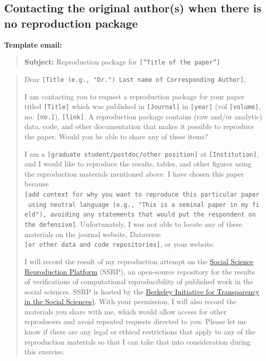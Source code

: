 \documentclass[]{book}
\begin{document}
\hypertarget{contacting-the-original-authors-when-there-is-no-reproduction-package}{%
\subsection{Contacting the original author(s) when there is no reproduction package}\label{contacting-the-original-authors-when-there-is-no-reproduction-package}}

\textbf{Template email:}

\begin{quote}
\textbf{Subject:} Reproduction package for \texttt{{[}“Title\ of\ the\ paper”{]}}
\end{quote}

\begin{quote}
Dear \texttt{{[}Title\ (e.g.,\ "Dr.")\ Last\ name\ of\ Corresponding\ Author{]}},

I am contacting you to request a reproduction package for your paper titled \texttt{{[}Title{]}} which was published in \texttt{{[}Journal{]}} in \texttt{{[}year{]}} (vol \texttt{{[}volume{]}}, no. \texttt{{[}no.{]}}), \texttt{{[}link{]}}. A reproduction package contains (raw and/or analytic) data, code, and other documentation that makes it possible to reproduce the paper. Would you be able to share any of these items?

I am a \texttt{{[}graduate\ student/postdoc/other\ position{]}} at \texttt{{[}Institution{]}}, and I would like to reproduce the results, tables, and other figures using the reproduction materials mentioned above. I have chosen this paper because \texttt{{[}add\ context\ for\ why\ you\ want\ to\ reproduce\ this\ particular\ paper\ using\ neutral\ language\ (e.g.,\ "This\ is\ a\ seminal\ paper\ in\ my\ field"),\ avoiding\ any\ statements\ that\ would\ put\ the\ respondent\ on\ the\ defensive{]}}. Unfortunately, I was not able to locate any of these materials on the journal website, Dataverse \texttt{{[}or\ other\ data\ and\ code\ repositories{]}}, or your website.

I will record the result of my reproduction attempt on the \href{https://www.socialsciencereproduction.org/}{Social Science Reproduction Platform} (SSRP), an open-source repository for the results of verifications of computational reproducibility of published work in the social sciences. SSRP is hosted by the \href{https://www.bitss.org/}{Berkeley Initiative for Transparency in the Social Sciences)}. With your permission, I will also record the materials you share with me, which would allow access for other reproducers and avoid repeated requests directed to you. Please let me know if there are any legal or ethical restrictions that apply to any of the reproduction materials so that I can take that into consideration during this exercise.


\end{quote}
\end{document}
